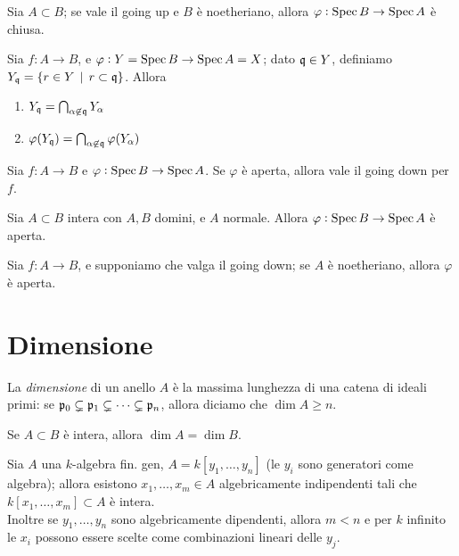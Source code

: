 \begin{proposition}
    Sia $A\subset B$; se vale il going up e $B$ è noetheriano, allora $\varphi:\operatorname{Spec} B\to\operatorname{Spec} A$ è chiusa.
\end{proposition}

\begin{lemma}
    Sia $f:A\to B$, e $\varphi:Y=\operatorname{Spec} B\to \operatorname{Spec} A=X$; dato $\mathfrak{q}\in Y$, definiamo $Y_{\mathfrak{q}}=\{ r\in Y \operatorname{\; |\;} r\subset \mathfrak{q} \}$. Allora
    \begin{enumerate}
        \item $Y_{\mathfrak{q}}=\bigcap_{\alpha\not\in \mathfrak{q}} Y_\alpha$
        \item $\varphi(Y_{\mathfrak{q}})=\bigcap_{\alpha\not\in \mathfrak{q}} \varphi(Y_\alpha)$
    \end{enumerate}
\end{lemma}

\begin{theorem}
    Sia $f:A\to B$ e $\varphi:\operatorname{Spec} B\to\operatorname{Spec} A$. Se $\varphi$ è aperta, allora vale il going down per $f$.
\end{theorem}

\begin{theorem}
    Sia $A\subset B$ intera con $A,B$ domini, e $A$ normale. Allora $\varphi:\operatorname{Spec} B\to\operatorname{Spec} A$ è aperta.
\end{theorem}

\begin{proposition}
    Sia $f:A\to B$, e supponiamo che valga il going down; se $A$ è noetheriano, allora $\varphi$ è aperta.
\end{proposition}


\section{Dimensione}

\begin{definition}
    La \emph{dimensione} di un anello $A$ è la massima lunghezza di una catena di ideali primi: se $\mathfrak{p}_0\subsetneq \mathfrak{p}_1\subsetneq\dots\subsetneq\mathfrak{p}_n$, allora diciamo che $\dim A\ge n$.
\end{definition}

\begin{proposition}
    Se $A\subset B$ è intera, allora $\dim A=\dim B$.
\end{proposition}

\begin{theorem}
    Sia $A$ una $k$-algebra fin. gen, $A=k[y_1,\dots,y_n]$ (le $y_i$ sono generatori come algebra); allora esistono $x_1,\dots,x_m\in A$ algebricamente indipendenti tali che $k[x_1,\dots,x_m]\subset A$ è intera.\\
    Inoltre se $y_1,\dots,y_n$ sono algebricamente dipendenti, allora $m<n$ e per $k$ infinito le $x_i$ possono essere scelte come combinazioni lineari delle $y_j$.
\end{theorem}

